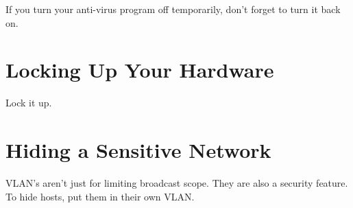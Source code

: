 \documentclass{article}
\begin{document}
If you turn your anti-virus program off temporarily, don't forget to turn it
back on.

\section{Locking Up Your Hardware}

Lock it up.

\section{Hiding a Sensitive Network}

VLAN's aren't just for limiting broadcast scope. They are also a security
feature. To hide hosts, put them in their own VLAN.
\end{document}

